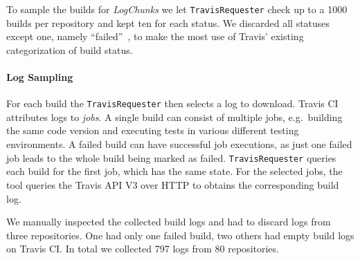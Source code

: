 \documentclass[\myrootdir/main.tex]{subfiles}
\begin{document}
To sample the builds for \emph{LogChunks} we let \texttt{TravisRequester} check up to a 1000 builds per repository and kept ten for each status.
We discarded all statuses except one, namely ``failed''~\cite{travis2009buildstatus}, to make the most use of Travis' existing categorization of build status.

\paragraph{Log Sampling}
For each build the \texttt{TravisRequester} then selects a log to download.
Travis CI attributes logs to \emph{jobs}.
A single build can consist of multiple jobs, e.g.\ building the same code version and executing tests in various different testing environments.
A failed build can have successful job executions, as just one failed job leads to the whole build being marked as failed.
\texttt{TravisRequester} queries each build for the first job, which has the same state.
For the selected jobs, the tool queries the Travis API V3 over HTTP to obtains the corresponding build log.

We manually inspected the collected build logs and had to discard logs from three repositories.
One had only one failed build, two others had empty build logs on Travis CI.
In total we collected 797 logs from 80 repositories.


\end{document}
